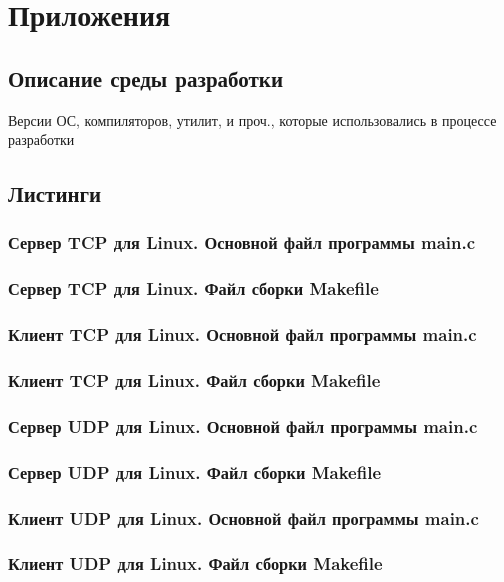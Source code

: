 \documentclass[12pt,a4paper]{report}
\begin{document}
\chapter{Приложения}
\section{Описание среды разработки}
Версии ОС, компиляторов, утилит, и проч., которые использовались в процессе разработки
\section{Листинги}
\subsection{Сервер TCP для Linux. Основной файл программы main.c}

\subsection{Сервер TCP для Linux. Файл сборки Makefile}

\subsection{Клиент TCP для Linux. Основной файл программы main.c}

\subsection{Клиент TCP для Linux. Файл сборки Makefile}

\subsection{Сервер UDP для Linux. Основной файл программы main.c}

\subsection{Сервер UDP для Linux. Файл сборки Makefile}

\subsection{Клиент UDP для Linux. Основной файл программы main.c}

\subsection{Клиент UDP для Linux. Файл сборки Makefile}

\end{document}
